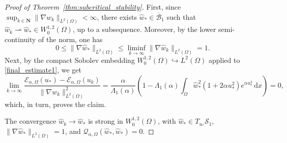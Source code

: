 \documentclass[reqno,11pt]{amsart}
\theoremstyle{definition}
\newcommand{\ud}{\,\mathrm{d}}
\begin{document}
\begin{proof}[Proof of Theorem~\ref{thm:subcritical_stability}]
    \noindent First, since $\sup_{k\in\mathbf{N}}\|\nabla w_k\|_{L^2(\Omega)}<\infty$, there exists $\widehat{w}_*\in \overline{\mathcal{B}}_1$ such that $\widehat{w}_k\rightharpoonup \widehat{w}_*\in W^{1,2}_0(\Omega)$, 
    up to a subsequence.
    Moreover, by the lower semi-continuity of the norm, one has
    \[
    0\leq\|{\nabla  \widehat{w}_*}\|_{L^2(\Omega)}\leq \liminf_{k\to\infty} \|{\nabla \widehat{w}_k}\|_{L^2(\Omega)}=1.
    \] 
    Next, by the compact Sobolev embedding $W^{1,2}_0(\Omega)\hookrightarrow L^2(\Omega)$ applied to \eqref{final_estimate1}, we get
	\begin{equation}\label{vai0} 
		\lim_{k \rightarrow \infty} \frac{\mathscr{E}_{\alpha,\Omega} (u_*) - \mathscr{E}_{\alpha,\Omega} (u_k)}
		{\| \nabla w_k \|_{L^2(\Omega)}^2}= \frac{\alpha}{\Lambda_1(\alpha)}\left(1 
		- \Lambda_1(\alpha) \int_\Omega \widehat{w}_*^2(1+2\alpha u_*^2)
		e^{\alpha u_*^2} \ud x\right) = 0,
	\end{equation}
    which, in turn, proves the claim.

     The convergence $\widehat{w}_k\rightarrow \widehat{w}_*$ is strong in $W^{1,2}_0(\Omega)$, with $\widehat{w}_*\in T_{u_*}\mathcal{S}_1$, $\|\nabla \widehat{w}_*\|_{L^2(\Omega)}=1$, and $\mathscr{Q}_{\alpha,\Omega}(\widehat{w}_*,\widehat{w}_*)=0$.
	

\end{proof}
\end{document}
